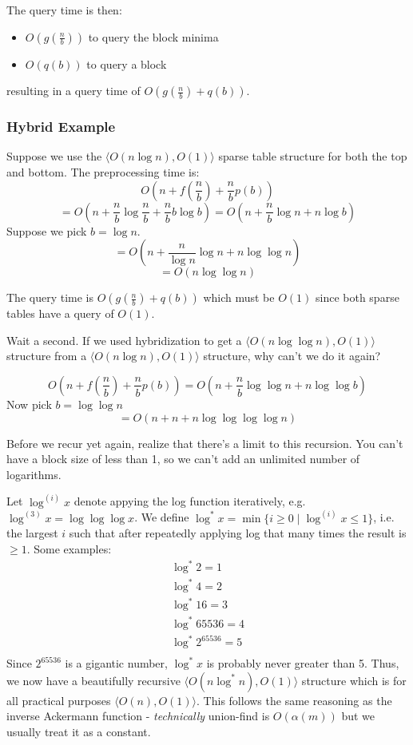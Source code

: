 \documentclass[11pt, oneside]{article}
\begin{document}
The query time is then:
\begin{itemize}
  \item \( O(g(\frac{n}{b})) \) to query the block minima
  \item \( O(q(b)) \) to query a block
\end{itemize}
resulting in a query time of \( O(g(\frac{n}{b}) + q(b)) \).

\subsubsection{Hybrid Example}

Suppose we use the \( \langle O(n \log n), O(1) \rangle \) sparse table
structure for both the top and bottom.
The preprocessing time is:
\[ O(n + f(\frac{n}{b}) + \frac{n}{b} p(b)) \]
\[ = O(n + \frac{n}{b} \log \frac{n}{b} + \frac{n}{b} b \log b) = O(n + \frac{n}{b} \log n + n \log b) \]
Suppose we pick \( b = \log n \).
\[ = O(n + \frac{n}{\log n} \log n + n \log {\log n}) \]
\[ = O(n \log {\log n}) \]

The query time is \( O(g(\frac{n}{b}) + q(b)) \) which
must be \( O(1) \) since both sparse tables have a query of \( O(1) \).

Wait a second. If we used hybridization to get a \( \langle O(n \log \log n), O(1) \rangle \) structure
from a \( \langle O(n \log n), O(1) \rangle \) structure, why can't we do it again?

\[ O(n + f(\frac{n}{b}) + \frac{n}{b} p(b)) = O(n + \frac{n}{b} \log \log n + n \log \log b) \]
Now pick \( b = \log \log n \)
\[ = O(n + n + n \log \log \log \log n) \]

Before we recur yet again, realize that there's a limit to this recursion. You can't have a block size of
less than 1, so we can't add an unlimited number of logarithms.

Let \( \log^{(i)} x \) denote appying the log function iteratively, e.g. \( \log^{(3)} x = \log \log \log x \). We define \( \log^* x = \min\{ i \geq 0 \mid \log^{(i)} x \leq 1\} \), i.e. the largest \( i \) such that after repeatedly applying log that many times the result is \( \geq 1 \). Some examples:
\begin{align*}
        \log^* 2 = 1 \\
        \log^* 4 = 2 \\
       \log^* 16 = 3 \\
    \log^* 65536 = 4 \\
\log^* 2^{65536} = 5 \\
\end{align*}
Since \( 2^{65536} \) is a gigantic number, \( \log^* x \) is probably never greater than 5.
Thus, we now have a beautifully recursive \( \langle O(n \log^* n), O(1) \rangle \) structure which is for all practical purposes \( \langle O(n), O(1) \rangle \).
This follows the same reasoning as the inverse Ackermann function - \textit{technically}
union-find is \( O(\alpha(m)) \) but we usually treat it as a constant.
\end{document}
